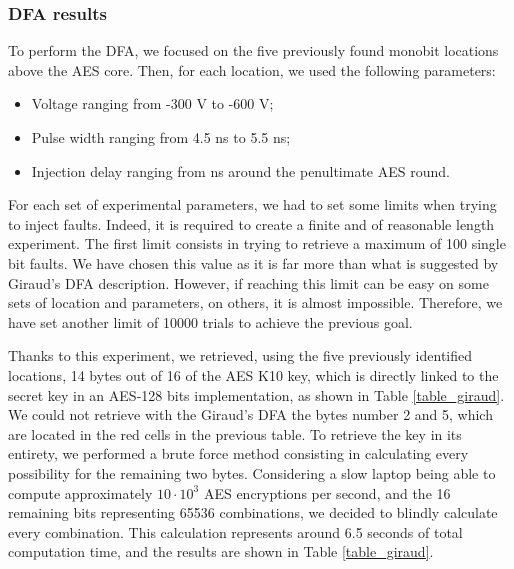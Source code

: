 		\subsubsection{DFA results}
			To perform the DFA, we focused on the five previously found monobit locations above the AES core.
			Then, for each location, we used the following parameters:
			\begin{itemize}
				\item Voltage ranging from -300 V to -600 V;
				\item Pulse width ranging from 4.5 ns to 5.5 ns;
				\item Injection delay ranging from  ns around the penultimate AES round.
			\end{itemize}
			For each set of experimental parameters, we had to set some limits when trying to inject faults.
			Indeed, it is required to create a finite and of reasonable length experiment.
			The first limit consists in trying to retrieve a maximum of 100 single bit faults.
			We have chosen this value as it is far more than what is suggested by Giraud's DFA \cite{giraudDfa} description.
			However, if reaching this limit can be easy on some sets of location and parameters, on others, it is almost impossible.
			Therefore, we have set another limit of 10000 trials to achieve the previous goal.
			
			Thanks to this experiment, we retrieved, using the five previously identified locations, 14 bytes out of 16 of the AES K10 key, which is directly linked to the secret key in an AES-128 bits implementation, as shown in Table \ref{table_giraud}.
			We could not retrieve with the Giraud's DFA the bytes number 2 and 5, which are located in the red cells in the previous table.
			To retrieve the key in its entirety, we performed a brute force method consisting in calculating every possibility for the remaining two bytes.
			Considering a slow laptop being able to compute approximately $10 \cdot 10^3$ AES encryptions per second, and the 16 remaining bits representing 65536 combinations, we decided to blindly calculate every combination.
			This calculation represents around 6.5 seconds of total computation time, and the results are shown in Table \ref{table_giraud}.

